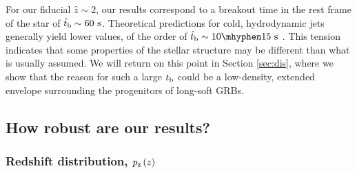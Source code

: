 \documentclass[useAMS,usenatbib]{mn2e}
\begin{document}
For our fiducial $\hat{z}\sim 2$, our results correspond to a breakout time in the rest frame of the star of $\hat{t}_{\rm b}\sim 60\text{ s}$. Theoretical predictions for cold, hydrodynamic jets generally yield lower values, of the order of $\hat{t}_{\rm b}\sim 10\mhyphen15\text{ s}$ \citep[e.g.][]{Bromberg2011,Bromberg2015}.
This tension indicates that some properties of the stellar structure may be different than what is usually assumed. We will return on this point in Section \ref{sec:dis}, where we show that the reason for such a large $t_{\rm b}$ could be a low-density, extended envelope surrounding the progenitors of long-soft GRBs.


\subsection{How robust are our results?} \label{sec:caveats}

\subsubsection{Redshift distribution, $p_{\rm z}\left(z\right)$}
\end{document}
